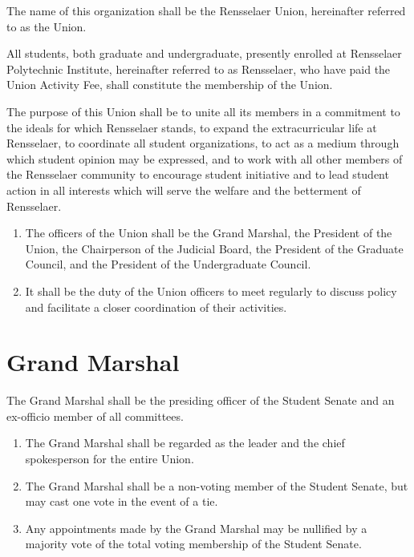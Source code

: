 \documentclass{uniondoc}
\begin{document}

The name of this organization shall be the Rensselaer Union, hereinafter referred to as the Union.


All students, both graduate and undergraduate, presently enrolled at Rensselaer Polytechnic Institute, hereinafter referred to as Rensselaer, who have paid the Union Activity Fee, shall constitute the membership of the Union.


The purpose of this Union shall be to unite all its members in a commitment to the ideals for which Rensselaer stands, to expand the extracurricular life at Rensselaer, to coordinate all student organizations, to act as a medium through which student opinion may be expressed, and to work with all other members of the Rensselaer community to encourage student initiative and to lead student action in all interests which will serve the welfare and the betterment of Rensselaer.


\begin{enumerate}
	\item The officers of the Union shall be the Grand Marshal, the President of the Union, the Chairperson of the Judicial Board, the President of the Graduate Council, and the President of the Undergraduate Council.
	\item It shall be the duty of the Union officers to meet regularly to discuss policy and facilitate a closer coordination of their activities.
\end{enumerate}

\section{Grand Marshal}

The Grand Marshal shall be the presiding officer of the Student Senate and an ex-officio member of all committees.

\begin{enumerate}
	\item The Grand Marshal shall be regarded as the leader and the chief spokesperson for the entire Union.
	\item The Grand Marshal shall be a non-voting member of the Student Senate, but may cast one vote in the event of a tie.
	\item Any appointments made by the Grand Marshal may be nullified by a majority vote of the total voting membership of the Student Senate.
\end{enumerate}
\end{document}
